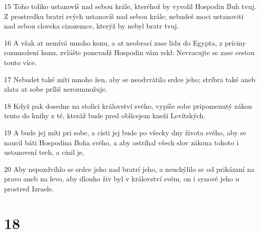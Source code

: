 \par 15 Toho toliko ustanovíš nad sebou krále, kteréhož by vyvolil Hospodin Buh tvuj. Z prostredku bratrí svých ustanovíš nad sebou krále; nebudeš moci ustanoviti nad sebou cloveka cizozemce, kterýž by nebyl bratr tvuj.
\par 16 A však at nemívá mnoho konu, a at neobrací zase lidu do Egypta, z príciny rozmnožení konu, zvlášte ponevadž Hospodin vám rekl: Nevracujte se zase cestou touto více.
\par 17 Nebudet také míti mnoho žen, aby se neodvrátilo srdce jeho; stríbra také aneb zlata at sobe príliš nerozmnožuje.
\par 18 Když pak dosedne na stolici království svého, vypíše sobe pripomenutý zákon tento do knihy z té, kteráž bude pred oblícejem kneží Levítských.
\par 19 A bude jej míti pri sobe, a císti jej bude po všecky dny života svého, aby se naucil báti Hospodina Boha svého, a aby ostríhal všech slov zákona tohoto i ustanovení tech, a cinil je,
\par 20 Aby nepozdvihlo se srdce jeho nad bratrí jeho, a neuchýlilo se od prikázaní na pravo aneb na levo, aby dlouho živ byl v království svém, on i synové jeho u prostred Izraele.

\chapter{18}

